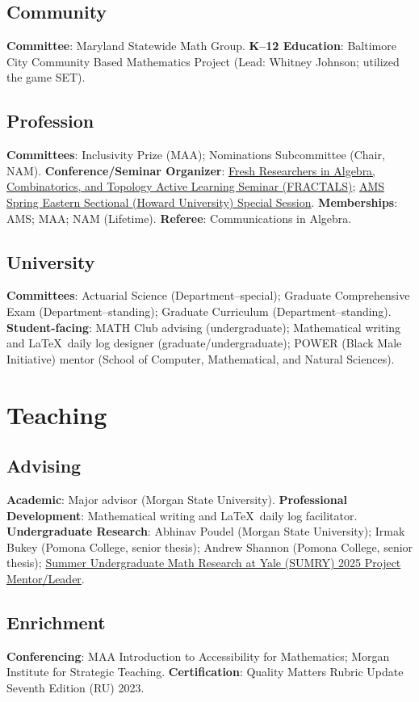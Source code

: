 \documentclass[10pt,a4paper]{article}
\newcommand{\Profile}{mathdwight} %
\newcommand{\MSU}{Morgan State University}
\newcommand{\Pomona}{Pomona College}
\newcommand{\SCMNS}{School of Computer, Mathematical, and Natural Sciences}
\begin{document}
\subsection{Community}
\textbf{Committee}: Maryland Statewide Math Group. \textbf{K--12 Education}: Baltimore City Community Based Mathematics Project (Lead: Whitney Johnson; utilized the game SET). 
\subsection{Profession}
\textbf{Committees}: Inclusivity Prize (MAA); Nominations Subcommittee (Chair, NAM). \textbf{Conference/Seminar Organizer}: \href{https://\Profile.com/FRACTALS}{Fresh Researchers in Algebra, Combinatorics, and Topology Active Learning Seminar (FRACTALS)};  \href{https://www.ams.org/meetings/sectional/2312\_program\_ss15.html\#title}{AMS Spring Eastern Sectional (Howard University) Special Session}.  \textbf{Memberships}: AMS; MAA; NAM (Lifetime). \textbf{Referee}: Communications in Algebra. 
\subsection{University}
\textbf{Committees}: Actuarial Science (Department--special); Graduate Comprehensive Exam (Department--standing); Graduate Curriculum (Department--standing). \textbf{Student-facing}: MATH Club advising (undergraduate); Mathematical writing and \LaTeX\ daily log designer (graduate/undergraduate); POWER (Black Male Initiative) mentor (\SCMNS).
\section{Teaching}
\subsection{Advising}
\textbf{Academic}: Major advisor (\MSU). \textbf{Professional Development}: Mathematical writing and \LaTeX\ daily log facilitator. \textbf{Undergraduate Research}: Abhinav Poudel (\MSU); Irmak Bukey (\Pomona, senior thesis); Andrew Shannon (\Pomona, senior thesis); \href{https://sumry.yale.edu/sumry-2025}{Summer Undergraduate Math Research at Yale (SUMRY) 2025 Project Mentor/Leader}. 
\subsection{Enrichment}
\textbf{Conferencing}: MAA Introduction to Accessibility for Mathematics; Morgan Institute for Strategic Teaching. \textbf{Certification}: Quality Matters Rubric Update Seventh Edition (RU) 2023.
\end{document}
